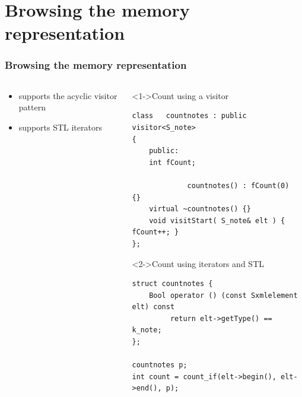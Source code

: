 \documentclass{beamer}
\begin{document}
\section{Browsing the memory representation}
\begin{frame}[fragile]
	\frametitle{Browsing the memory representation}

	\begin{columns}
		\begin{column}[c]{50mm}
		
\begin{itemize}
			\item<1-> supports the acyclic visitor pattern
		\vspace{25mm}
			\item<2-> supports STL iterators
	   \end{itemize}
		\end{column}

		\begin{column}[c]{65mm}
		\begin{block}<1->{Count using a visitor}
\begin{lstlisting}
class   countnotes : public visitor<S_note>
{
    public:
    int fCount;

             countnotes() : fCount(0)	{}
    virtual ~countnotes() {}
    void visitStart( S_note& elt ) { fCount++; }
};
\end{lstlisting}
		\end{block}

		\begin{block}<2->{Count using iterators and STL}
\begin{lstlisting}
struct countnotes {
    Bool operator () (const Sxmlelement elt) const
         return elt->getType() == k_note;
};

countnotes p;
int count = count_if(elt->begin(), elt->end(), p);
\end{lstlisting}
		\end{block}
		\end{column}
	\end{columns}
\end{frame}

\end{document}

